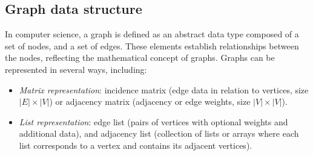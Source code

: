 \subsection{Graph data structure}
In computer science, a graph is defined as an abstract data type composed of a set of nodes, and a set of edges. 
These elements establish relationships between the nodes, reflecting the mathematical concept of graphs.
Graphs can be represented in several ways, including:
\begin{itemize}
    \item \textit{Matrix representation}: incidence matrix (edge data in relation to vertices, size $|E|\times|V|$) or adjacency matrix (adjacency or edge weights, size $|V|\times|V|$). 
    \item \textit{List representation}: edge list (pairs of vertices with optional weights and additional data), and adjacency list (collection of lists or arrays where each list corresponds to a vertex and contains its adjacent vertices).
\end{itemize}